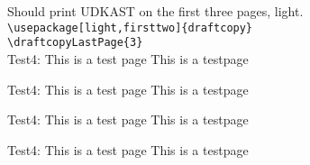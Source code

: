 \documentclass[a4paper,danish]{article}
\newcommand{\xx}{
Test4: This is a test page \thepage \vfill
This is a testpage \thepage \newpage
}
\begin{document}
Should print UDKAST on the first three pages, light.\\
\verb|\usepackage[light,firsttwo]{draftcopy}|\\
\verb|\draftcopyLastPage{3}|\\
\xx\xx\xx\xx
\end{document}
